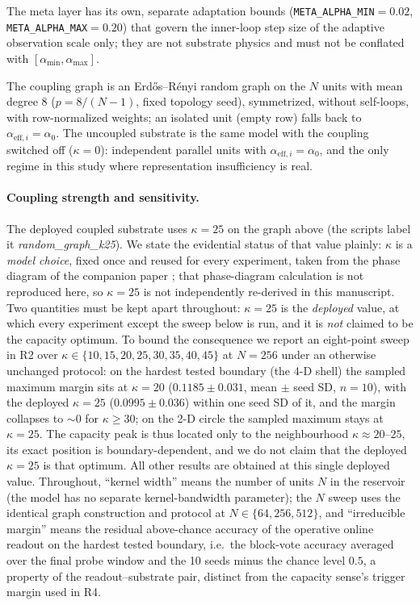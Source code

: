 \documentclass[preprint,12pt]{elsarticle}
\begin{document}
\begin{sloppypar}
The meta layer has its own, separate adaptation bounds
(\texttt{META\_ALPHA\_MIN}\allowbreak$=0.02$,
\texttt{META\_ALPHA\_MAX}\allowbreak$=0.20$) that
govern the inner-loop step size of the adaptive observation scale only; they
are not substrate physics and must not be conflated with
$[\alpha_{\min},\alpha_{\max}]$.
\end{sloppypar}

The coupling graph is an Erd\H{o}s--R\'enyi
random graph on the $N$ units with mean degree $8$
($p=8/(N-1)$, fixed topology seed), symmetrized, without self-loops, with
row-normalized weights; an isolated unit (empty row) falls back to
$\alpha_{\mathrm{eff},i}=\alpha_0$. The uncoupled substrate is the same model
with the coupling switched off ($\kappa=0$): independent parallel units with
$\alpha_{\mathrm{eff},i}=\alpha_0$, and the only regime in this study where
representation insufficiency is real.

\paragraph{Coupling strength and sensitivity.} The deployed coupled substrate
uses $\kappa=25$ on the graph above (the scripts label it
\textit{random\_graph\_k25}). We state the evidential status of that value
plainly: $\kappa$ is a \emph{model choice}, fixed once and reused for every
experiment, taken from the phase diagram of the companion paper
\cite{companionA}; that phase-diagram calculation is not reproduced here, so
$\kappa=25$ is not independently re-derived in this manuscript. Two quantities
must be kept apart throughout: $\kappa=25$ is the \emph{deployed} value, at
which every experiment except the sweep below is run, and it is \emph{not}
claimed to be the capacity optimum. To bound the consequence we report an
eight-point sweep in R2 over
$\kappa\in\{10,15,20,25,30,35,40,45\}$ at $N=256$ under an otherwise unchanged
protocol: on the hardest tested boundary (the 4-D shell) the sampled maximum
margin sits at $\kappa=20$ ($0.1185\pm0.031$, mean $\pm$ seed SD, $n=10$),
with the deployed $\kappa=25$ ($0.0995\pm0.036$) within one seed SD of it,
and the margin collapses to $\sim0$ for $\kappa\geq30$; on the 2-D circle the
sampled maximum stays at $\kappa=25$. The capacity peak is thus located only
to the neighbourhood $\kappa\approx20$--$25$, its exact position is
boundary-dependent, and we do not claim that the deployed $\kappa=25$ is that
optimum. All other
results are obtained at this single deployed value. Throughout, ``kernel width'' means the number of
units $N$ in the reservoir (the model has no separate kernel-bandwidth
parameter); the $N$ sweep uses the identical graph construction and protocol
at $N\in\{64,256,512\}$, and ``irreducible margin'' means the residual
above-chance accuracy of the operative online readout on the hardest tested
boundary, i.e.\ the block-vote accuracy averaged over the final probe window
and the 10 seeds minus the chance level $0.5$, a property of the
readout--substrate pair, distinct from the capacity sense's trigger margin
used in R4.
\end{document}
